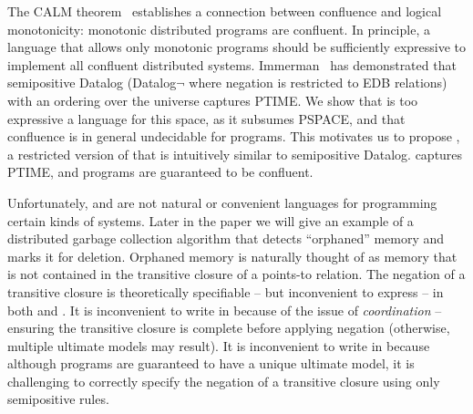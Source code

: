 The CALM theorem~\cite{cidr11, declarative-imperative, relational-transducers} establishes a connection between confluence
and logical monotonicity: monotonic distributed programs are confluent.  In principle, a language that allows only
monotonic programs should be sufficiently expressive to implement all confluent distributed systems.
Immerman~\cite{immerman-ptime} has demonstrated that semipositive Datalog (Datalog$\lnot$ where negation is restricted to EDB relations) with an ordering over the universe captures PTIME.
We show that \lang is too expressive a language for this space, as it subsumes PSPACE, and that confluence is in general
undecidable for \lang programs.  This motivates us to propose \slang, a restricted version of \lang that is intuitively similar to semipositive Datalog.  \slang captures PTIME, and \slang programs are guaranteed to be confluent.

Unfortunately, \lang and \slang are not natural or convenient languages for programming certain kinds of systems.  Later in the paper we will give 
an example of a distributed garbage collection algorithm that detects ``orphaned'' memory and marks it for deletion.  Orphaned memory is naturally thought of as memory that is not contained in the transitive closure of a points-to relation.  The negation of a transitive closure is theoretically specifiable -- but inconvenient
to express -- in both \lang and \slang.  It is inconvenient to write in \lang because of the issue of {\em coordination} -- ensuring the transitive closure is complete before applying negation (otherwise, multiple ultimate models may result).  It is inconvenient to write in \slang because although \slang programs are guaranteed to have a unique ultimate model, it is challenging to correctly specify the negation of a transitive closure using only semipositive rules.


